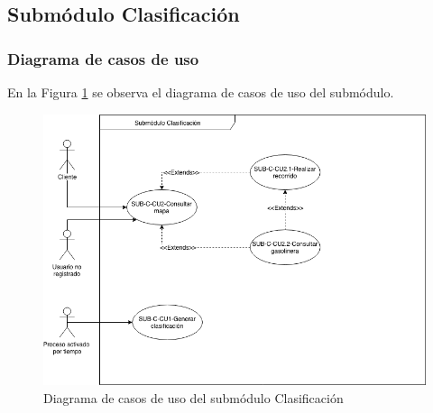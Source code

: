 \subsection{Submódulo Clasificación}
\subsubsection{Diagrama de casos de uso}
En la Figura \ref{fig:dcu-clasificacion} se observa el diagrama de casos de uso del submódulo.
\begin{figure}[H]
	\centering
	\includegraphics[scale=.6]{Capitulo4/software/submodulos/clasificacion/images/dcu}
	\caption{Diagrama de casos de uso del submódulo Clasificación}
	\label{fig:dcu-clasificacion}
\end{figure}
\newpage



